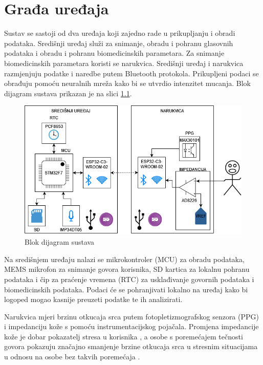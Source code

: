 \chapter{Građa uređaja}
\label{pog:structure}

Sustav se sastoji od dva uređaja koji zajedno rade u prikupljanju i obradi podataka. Središnji uređaj služi za snimanje, obradu i pohranu glasovnih podataka i obradu i pohranu biomedicinskih parametara. Za snimanje biomedicinskih parametara koristi se narukvica. Središnji uređaj i narukvica razmjenjuju podatke i naredbe putem Bluetooth protokola. Prikupljeni podaci se obrađuju pomoću neuralnih mreža kako bi se utvrdio intenzitet mucanja. Blok dijagram sustava prikazan je na slici \ref{slk:BD_MAIN}.
\begin{figure}[htb]
    \centering
    \includegraphics[width=\textwidth]{Figures/block_diagram.drawio.png}
    \caption{Blok dijagram sustava}
    \label{slk:BD_MAIN}
\end{figure}

Na središnjem uređaju nalazi se mikrokontroler (MCU) za obradu podataka, MEMS mikrofon za snimanje govora korisnika, SD kartica za lokalnu pohranu podataka i čip za praćenje vremena (RTC) za usklađivanje govornih podataka i biomedicinskih podataka. Podaci će se pohranjivati lokalno na uređaj kako bi logoped mogao kasnije preuzeti podatke te ih analizirati.

Narukvica mjeri brzinu otkucaja srca putem fotopletizmografskog senzora (PPG) i impedanciju kože s pomoću instrumentacijskog pojačala. Promjena impedancije kože je dobar pokazatelj stresa u korisnika \cite{edr}, a osobe s poremećajem tečnosti govora pokazuju značajno smanjenje brzine otkucaja srca u stresnim situacijama u odnosu na osobe bez takvih poremećaja \cite{ALM2004123}.

